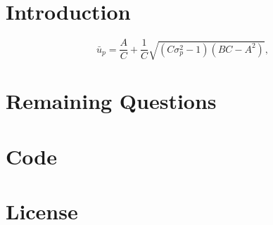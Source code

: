 \documentclass[a4paper]{article}
\title{\documenttitle}
\date{\today}
\author{Frans Englich \\
        \href{mailto:fenglich@fastmail.fm}{fenglich@fastmail.fm}}
\begin{document}
\maketitle

\section{Introduction}



 





% 



\begin{equation*}
    \bar{u}_p = \frac{A}{C} + \frac{1}{C} \sqrt{(C\sigma^2_p - 1)(BC - A^2)},
\end{equation*}

\section{Remaining Questions}

\printbibliography

\appendix

\section{Code}

%

\section{License}

\doclicenseThis
\end{document}
